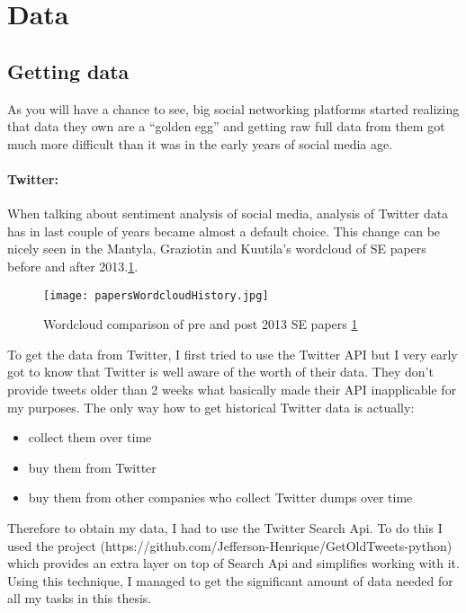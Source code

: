 \section{Data}
\subsection{Getting data} \label{ssec:GettingData}
As you will have a chance to see, big social networking platforms started realizing that data they own are a “golden egg” and getting raw full data from them got much more difficult than it was in the early years of social media age.

\paragraph{Twitter:}
When talking about sentiment analysis of social media, analysis of Twitter data has in last couple of years became almost a default choice. This change can be nicely seen in the Mantyla, Graziotin and Kuutila's \cite{mantyla2018evolution} wordcloud of SE papers before and after 2013.\ref{fig:papersWordcloudHistory}.

\begin{figure}[H]%
    \centering
	\texttt{[image: papersWordcloudHistory.jpg]}
    \caption{Wordcloud comparison of pre and post 2013 SE papers \ref{fig:papersWordcloudHistory}}%
    \label{fig:papersWordcloudHistory}%
\end{figure}

To get the data from Twitter,  I first tried to use the Twitter API but I very early got to know that Twitter is well aware of the worth of their data. They don't provide tweets older than 2 weeks what basically made their API inapplicable for my purposes. The only way how to get historical Twitter data is actually:

\begin{itemize}
  \item collect them over time
  \item buy them from Twitter
  \item buy them from other companies who collect Twitter dumps over time
\end{itemize}

Therefore to obtain my data, I had to use the Twitter Search Api. To do this I used the project (https://github.com/Jefferson-Henrique/GetOldTweets-python) which provides an extra layer on top of Search Api and simplifies working with it. Using this technique, I managed to get the significant amount of data needed for all my tasks in this thesis.


